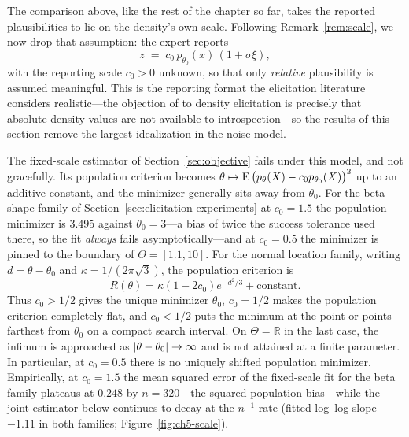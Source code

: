 The comparison above, like the rest of the chapter so far, takes the reported plausibilities to lie on the density's own scale. Following Remark~\ref{rem:scale}, we now drop that assumption: the expert reports
\[
z \;=\; c_{0}\,p_{\theta_{0}}(x)\,(1+\sigma\xi),
\]
with the reporting scale $c_{0}>0$ unknown, so that only \emph{relative} plausibility is assumed meaningful. This is the reporting format the elicitation literature considers realistic---the objection of \cite{Mikkola2023} to density elicitation is precisely that absolute density values are not available to introspection---so the results of this section remove the largest idealization in the noise model.

The fixed-scale estimator of Section~\ref{sec:objective} fails under this model, and not gracefully. Its population criterion becomes $\theta\mapsto\mathrm{E}\,\big(p_{\theta}(X)-c_{0}p_{\theta_{0}}(X)\big)^{2}$ up to an additive constant, and the minimizer generally sits away from $\theta_{0}$. For the beta shape family of Section~\ref{sec:elicitation-experiments} at $c_{0}=1.5$ the population minimizer is $3.495$ against $\theta_{0}=3$---a bias of twice the success tolerance used there, so the fit \emph{always} fails asymptotically---and at $c_{0}=0.5$ the minimizer is pinned to the boundary of $\Theta=[1.1,10]$. For the normal location family, writing $d=\theta-\theta_0$ and $\kappa=1/(2\pi\sqrt{3})$, the population criterion is
\[
R(\theta)=\kappa(1-2c_0)e^{-d^2/3}+\text{constant}.
\]
Thus $c_0>1/2$ gives the unique minimizer $\theta_0$, $c_0=1/2$ makes the population criterion completely flat, and $c_0<1/2$ puts the minimum at the point or points farthest from $\theta_0$ on a compact search interval. On $\Theta=\mathbb{R}$ in the last case, the infimum is approached as $\lvert\theta-\theta_0\rvert\to\infty$ and is not attained at a finite parameter. In particular, at $c_0=0.5$ there is no uniquely shifted population minimizer. Empirically, at $c_{0}=1.5$ the mean squared error of the fixed-scale fit for the beta family plateaus at $0.248$ by $n=320$---the squared population bias---while the joint estimator below continues to decay at the $n^{-1}$ rate (fitted log--log slope $-1.11$ in both families; Figure~\ref{fig:ch5-scale}).

